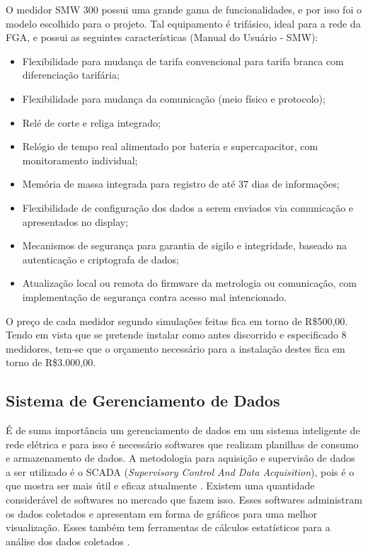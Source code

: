 O medidor SMW 300 possui uma grande gama de funcionalidades, e por isso foi o
modelo escolhido para o projeto. Tal equipamento é trifásico, ideal para a rede da FGA, e possui as seguintes características (Manual do Usuário - SMW):
\begin{itemize}
\item Flexibilidade para mudança de tarifa convencional para tarifa branca com diferenciação tarifária;
\item Flexibilidade para mudança da comunicação (meio físico e protocolo);
\item Relé de corte e religa integrado;
\item Relógio de tempo real alimentado por bateria e supercapacitor, com monitoramento individual;
\item Memória de massa integrada para registro de até 37 dias de informações;
\item Flexibilidade de configuração dos dados a serem enviados via comunicação e apresentados no display;
\item Mecanismos de segurança para garantia de sigilo e integridade, baseado na autenticação e criptografa de dados;
\item Atualização local ou remota do firmware da metrologia ou comunicação, com implementação de segurança contra acesso mal intencionado.
\end{itemize}

O preço de cada medidor segundo simulações feitas fica em torno de R\$500,00. Tendo em vista que se pretende instalar como antes discorrido e especificado 8 medidores, tem-se que o orçamento necessário para a instalação destes fica em torno de R\$3.000,00.

\subsection{Sistema de Gerenciamento de Dados}
É de suma importância um gerenciamento de dados em um sistema inteligente de rede elétrica e para isso é necessário softwares que realizam planilhas de consumo e armazenamento de dados. A metodologia para aquisição e supervisão de dados a ser utilizado é o SCADA (\textit{Supervisory Control And Data Acquisition}), pois é o que mostra ser mais útil e eficaz atualmente \cite{4}. Existem uma quantidade considerável de softwares no mercado que fazem isso. Esses softwares administram os dados coletados e apresentam em forma de gráficos para uma melhor visualização. Esses também tem ferramentas de cálculos estatísticos para a análise dos dados coletados \cite{5}.

